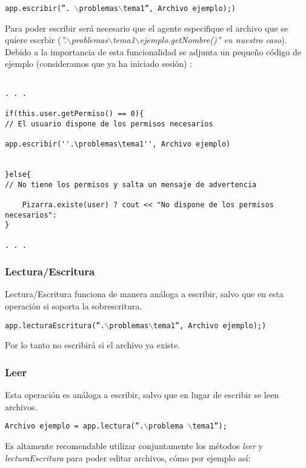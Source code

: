 \begin{center}
\texttt{app.escribir(''. $\backslash$problemas$\backslash$tema1'', Archivo ejemplo);)}
\end{center}

Para poder escribir será necesario que el agente especifique el archivo que se quiere escrbir (\emph{''.$\backslash$problemas$\backslash$tema1$\backslash$ejemplo.getNombre()'' en nuestro caso}).\\

Debido a la importancia de esta funcionalidad se adjunta un pequeño código de ejemplo (consideramos que ya ha iniciado sesión) :
\begin{lstlisting}

. . .

if(this.user.getPermiso() == 0){ 
// El usuario dispone de los permisos necesarios

app.escribir(''.\problemas\tema1'', Archivo ejemplo) 


}else{            
// No tiene los permisos y salta un mensaje de advertencia

    Pizarra.existe(user) ? cout << "No dispone de los permisos necesarios":
}

. . .
\end{lstlisting}

\subsubsection{Lectura/Escritura}
Lectura/Escritura funciona de manera análoga a escribir, salvo que en esta operación si soporta la sobrescritura.

\begin{center}
\texttt{app.lecturaEscritura(''.$\backslash$problemas$\backslash$tema1'', Archivo ejemplo);)}
\end{center}

Por lo tanto no escribirá si el archivo ya existe.

\subsubsection{Leer}
Esta operación es análoga a escribir, salvo que en lugar de escribir se leen archivos.

\begin{center}
\texttt{Archivo ejemplo = app.lectura(''.$\backslash$problema $\backslash$tema1'');}
\end{center}

Es altamente recomendable utilizar conjuntamente los métodos \emph{leer} y \emph{lecturaEscritura} para poder editar archivos, cómo por ejemplo así:

